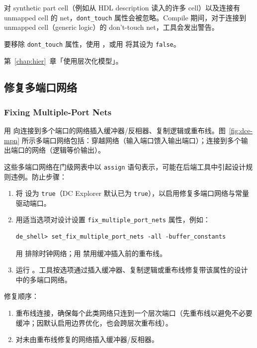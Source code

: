 \begin{noteBox}
对 synthetic part cell（例如从 HDL description 读入的许多 cell）以及连接有 unmapped cell 的 net，\texttt{dont\_touch} 属性会被忽略。Compile 期间，对于连接到 unmapped cell（generic logic）的 don't-touch net，工具会发出警告。
\end{noteBox}

要移除 \texttt{dont\_touch} 属性，使用 ，或用  将其设为 \texttt{false}。

\begin{seeAlsoBox}
第~\ref{chap:hier}~章「使用层次化模型」。
\end{seeAlsoBox}

\subsection{修复多端口网络}
\subsubsection*{Fixing Multiple-Port Nets}

用  向连接到多个端口的网络插入缓冲器/反相器、复制逻辑或重布线。图~\ref{fig:dce-mpn} 所示多端口网络包括：穿越网络（输入端口馈入输出端口）；连接到多个输出端口的网络（逻辑等价输出）。


这些多端口网络在门级网表中以 \texttt{assign} 语句表示，可能在后端工具中引起设计规则违例。防止步骤：
\begin{enumerate}
  \item 将  设为 \texttt{true}（DC Explorer 默认已为 \texttt{true}），以启用修复多端口网络与常量驱动端口。
  \item 用适当选项对设计设置 \texttt{fix\_multiple\_port\_nets} 属性，例如：
\begin{lstlisting}
de_shell> set_fix_multiple_port_nets -all -buffer_constants
\end{lstlisting}
        用  排除时钟网络；用  禁用缓冲插入前的重布线。
  \item 运行 。工具按选项通过插入缓冲器、复制逻辑或重布线修复带该属性的设计中的多端口网络。
\end{enumerate}

修复顺序：
\begin{enumerate}
  \item 重布线连接，确保每个此类网络只连到一个层次端口（先重布线以避免不必要缓冲；因默认启用边界优化，也会跨层次重布线）。
  \item 对未由重布线修复的网络插入缓冲器/反相器。
\end{enumerate}

